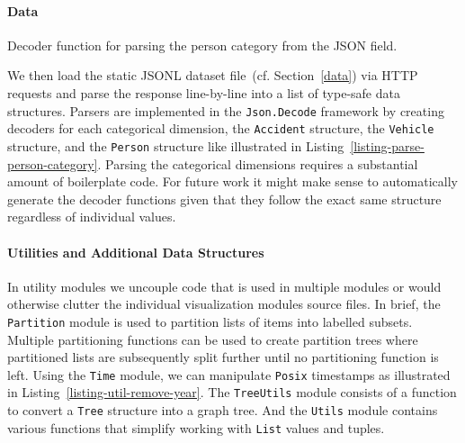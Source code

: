 \paragraph{Data}
\begin{listing}
    
    \caption{Decoder function for parsing the person category from the JSON field.}
    \label{listing-parse-person-category}
\end{listing}
We then load the static JSONL dataset file~(cf. Section~\ref{data}) via HTTP requests and parse the response line-by-line into a list of type-safe data structures. Parsers are implemented in the \lstinline{Json.Decode} framework by creating decoders for each categorical dimension, the \lstinline{Accident} structure, the \lstinline{Vehicle} structure, and the \lstinline{Person} structure like illustrated in Listing~\ref{listing-parse-person-category}.
Parsing the categorical dimensions requires a substantial amount of boilerplate code. For future work it might make sense to automatically generate the decoder functions given that they follow the exact same structure regardless of individual values.

\paragraph{Utilities and Additional Data Structures}
\begin{listing}
    
    \caption{Helper function for stripping the year field represented in a \lstinline{Posix} timestamp.}
    \label{listing-util-remove-year}
\end{listing}
In utility modules we uncouple code that is used in multiple modules or would otherwise clutter the individual visualization modules source files.
In brief, the \lstinline{Partition} module is used to partition lists of items into labelled subsets. Multiple partitioning functions can be used to create partition trees where partitioned lists are subsequently split further until no partitioning function is left.
Using the \lstinline{Time} module, we can manipulate \lstinline{Posix} timestamps as illustrated in Listing~\ref{listing-util-remove-year}.
The \lstinline{TreeUtils} module consists of a function to convert a \lstinline{Tree} structure into a graph tree.
And the \lstinline{Utils} module contains various functions that simplify working with \lstinline{List} values and tuples.

